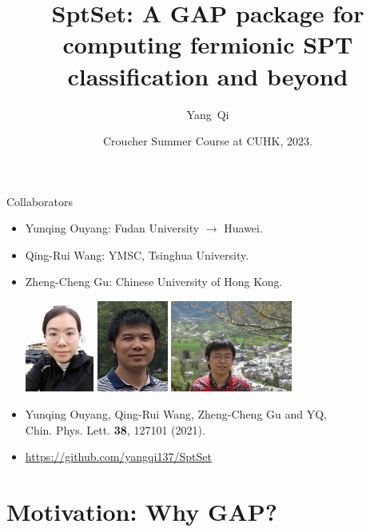 \documentclass[xcolor=table, aspectratio=169]{beamer}
\title[Intro to SptSet] %
{SptSet: A GAP package for computing fermionic SPT classification and beyond}
\author[Y Qi] %
{Yang~Qi}
\institute[Fudan] %
{Department of Physics, Fudan University}
\date{Croucher Summer Course at CUHK, 2023.}
\begin{document}
\begin{frame}
  \titlepage
\end{frame}

\begin{frame}{Collaborators}
\begin{itemize}
\item Yunqing Ouyang: Fudan University $\rightarrow$ Huawei.
\item Qing-Rui Wang: YMSC, Tsinghua University.
\item Zheng-Cheng Gu: Chinese University of Hong Kong.
\begin{center}
	\includegraphics[height=3cm]{../people/yunqing}
	\includegraphics[height=3cm]{../people/qingrui}
	\includegraphics[height=3cm]{../people/zhengcheng}
\end{center}
\item Yunqing Ouyang, Qing-Rui Wang, Zheng-Cheng Gu and YQ,\\
Chin. Phys. Lett. \textbf{38}, 127101 (2021).
\item \url{https://github.com/yangqi137/SptSet}
\end{itemize}
\end{frame}

\section{Motivation: Why GAP?}
\end{document}
